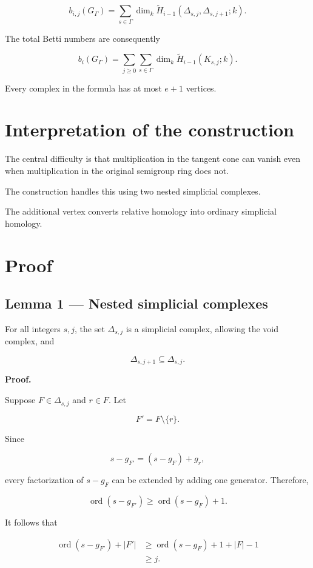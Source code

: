 \documentclass[11pt]{article}
\begin{document}
\[
\boxed{
b_{i,j}(G_\Gamma)=
\sum_{s\in\Gamma}
\dim_k\widetilde H_{i-1}
(\Delta_{s,j},\Delta_{s,j+1};k).
}
\]

The total Betti numbers are consequently

\[
b_i(G_\Gamma)=
\sum_{j\ge0}\sum_{s\in\Gamma}
\dim_k\widetilde H_{i-1}(K_{s,j};k).
\]

Every complex in the formula has at most \(e+1\) vertices.

\section{Interpretation of the construction}

The central difficulty is that multiplication in the tangent cone can vanish even when multiplication in the original semigroup ring does not.

The construction handles this using two nested simplicial complexes.

The additional vertex converts relative homology into ordinary simplicial homology.

\section{Proof}

\subsection{Lemma 1 --- Nested simplicial complexes}

For all integers \(s,j\), the set \(\Delta_{s,j}\) is a simplicial complex, allowing the void complex, and

\[
\Delta_{s,j+1}\subseteq\Delta_{s,j}.
\]

\textbf{Proof.}

Suppose \(F\in\Delta_{s,j}\) and \(r\in F\). Let

\[
F'=F\setminus\{r\}.
\]

Since

\[
s-g_{F'}=(s-g_F)+g_r,
\]

every factorization of \(s-g_F\) can be extended by adding one generator. Therefore,

\[
\operatorname{ord}(s-g_{F'})
\ge
\operatorname{ord}(s-g_F)+1.
\]

It follows that

\[
\begin{aligned}
\operatorname{ord}(s-g_{F'})+|F'|
&\ge
\operatorname{ord}(s-g_F)+1+|F|-1\\
&\ge j.
\end{aligned}
\]
\end{document}
